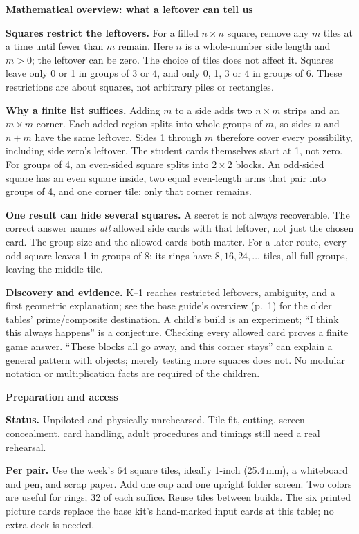 \documentclass[11pt]{article}
\newcommand{\head}[1]{\par\textbf{\large #1}\par}
\begin{document}
\head{Mathematical overview: what a leftover can tell us}
\textbf{Squares restrict the leftovers.} For a filled $n\times n$ square, remove any $m$ tiles at a time until fewer than $m$ remain. Here $n$ is a whole-number side length and $m>0$; the leftover can be zero. The choice of tiles does not affect it. Squares leave only 0 or 1 in groups of 3 or 4, and only 0, 1, 3 or 4 in groups of 6. These restrictions are about squares, not arbitrary piles or rectangles.

\textbf{Why a finite list suffices.} Adding $m$ to a side adds two $n\times m$ strips and an $m\times m$ corner. Each added region splits into whole groups of $m$, so sides $n$ and $n+m$ have the same leftover. Sides 1 through $m$ therefore cover every possibility, including side zero's leftover. The student cards themselves start at 1, not zero. For groups of 4, an even-sided square splits into $2\times2$ blocks. An odd-sided square has an even square inside, two equal even-length arms that pair into groups of 4, and one corner tile: only that corner remains.

\textbf{One result can hide several squares.} A secret is not always recoverable. The correct answer names \emph{all} allowed side cards with that leftover, not just the chosen card. The group size and the allowed cards both matter. For a later route, every odd square leaves 1 in groups of 8: its rings have $8,16,24,\ldots$ tiles, all full groups, leaving the middle tile.

\textbf{Discovery and evidence.} K--1 reaches restricted leftovers, ambiguity, and a first geometric explanation; see the base guide's overview (p.\ 1) for the older tables' prime/composite destination. A child's build is an experiment; ``I think this always happens'' is a conjecture. Checking every allowed card proves a finite game answer. ``These blocks all go away, and this corner stays'' can explain a general pattern with objects; merely testing more squares does not. No modular notation or multiplication facts are required of the children.

\head{Preparation and access}
\textbf{Status.} Unpiloted and physically unrehearsed. Tile fit, cutting, screen concealment, card handling, adult procedures and timings still need a real rehearsal.

\textbf{Per pair.} Use the week's 64 square tiles, ideally 1-inch (25.4\,mm), a whiteboard and pen, and scrap paper. Add one cup and one upright folder screen. Two colors are useful for rings; 32 of each suffice. Reuse tiles between builds. The six printed picture cards replace the base kit's hand-marked input cards at this table; no extra deck is needed.
\end{document}
